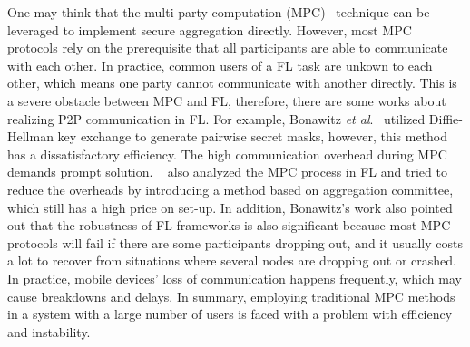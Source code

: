One may think that the multi-party computation (MPC)~\cite{Yao} technique can be leveraged to implement secure aggregation directly. However, most MPC protocols rely on the prerequisite that all participants are able to communicate with each other. In practice, common users of a FL task are unkown to each other, which means one party cannot communicate with another directly. This is a severe obstacle between MPC and FL, therefore, there are some works about realizing P2P communication in FL. For example, Bonawitz \emph{et al}.~\cite{Practical} utilized Diffie-Hellman key exchange to generate pairwise secret masks, however, this method has a dissatisfactory efficiency. The high communication overhead during MPC demands prompt solution. ~\cite{Two-Phase} also analyzed the MPC process in FL and tried to reduce the overheads by introducing a method based on aggregation committee, which still has a high price on set-up. In addition, Bonawitz's work also pointed out that the robustness of FL frameworks is also significant because most MPC protocols will fail if there are some participants dropping out, and it usually costs a lot to recover from situations where several nodes are dropping out or crashed. In practice, mobile devices' loss of communication happens frequently, which may cause breakdowns and delays. In summary, employing traditional MPC methods in a system with a large number of users is faced with a problem with efficiency and instability.


